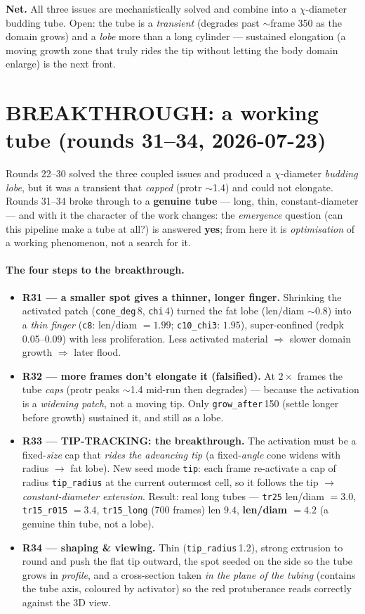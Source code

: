 \documentclass[11pt]{article}
\begin{document}
\textbf{Net.} All three issues are mechanistically solved and combine into a $\chi$-diameter budding tube.
Open: the tube is a \emph{transient} (degrades past $\sim$frame 350 as the domain grows) and a \emph{lobe}
more than a long cylinder --- sustained elongation (a moving growth zone that truly rides the tip without
letting the body domain enlarge) is the next front.

\section{BREAKTHROUGH: a working tube (rounds 31--34, 2026-07-23)}
Rounds 22--30 solved the three coupled issues and produced a $\chi$-diameter \emph{budding lobe}, but it was
a transient that \emph{capped} (protr $\sim$1.4) and could not elongate. Rounds 31--34 broke through to a
\textbf{genuine tube} --- long, thin, constant-diameter --- and with it the character of the work changes:
the \emph{emergence} question (can this pipeline make a tube at all?) is answered \textbf{yes}; from here it is
\emph{optimisation} of a working phenomenon, not a search for it.

\paragraph{The four steps to the breakthrough.}
\begin{itemize}\itemsep2pt
\item \textbf{R31 --- a smaller spot gives a thinner, longer finger.} Shrinking the activated patch
(\texttt{cone\_deg}\,8, \texttt{chi}\,4) turned the fat lobe (len/diam $\sim$0.8) into a \emph{thin finger}
(\texttt{c8}: len/diam $=1.99$; \texttt{c10\_chi3}: $1.95$), super-confined (redpk 0.05--0.09) with less
proliferation. Less activated material $\Rightarrow$ slower domain growth $\Rightarrow$ later flood.
\item \textbf{R32 --- more frames don't elongate it (falsified).} At $2\times$ frames the tube \emph{caps}
(protr peaks $\sim$1.4 mid-run then degrades) --- because the activation is a \emph{widening patch}, not a
moving tip. Only \texttt{grow\_after}\,150 (settle longer before growth) sustained it, and still as a lobe.
\item \textbf{R33 --- TIP-TRACKING: the breakthrough.} The activation must be a fixed-\emph{size} cap that
\emph{rides the advancing tip} (a fixed-\emph{angle} cone widens with radius $\to$ fat lobe). New seed mode
\texttt{tip}: each frame re-activate a cap of radius \texttt{tip\_radius} at the current outermost cell, so
it follows the tip $\to$ \emph{constant-diameter extension}. Result: real long tubes ---
\texttt{tr25} len/diam $=3.0$, \texttt{tr15\_r015} $=3.4$, \texttt{tr15\_long} (700 frames) len $9.4$,
\textbf{len/diam $=4.2$} (a genuine thin tube, not a lobe).
\item \textbf{R34 --- shaping \& viewing.} Thin (\texttt{tip\_radius}\,1.2), strong extrusion to round and push
the flat tip outward, the spot seeded on the side so the tube grows in \emph{profile}, and a cross-section
taken \emph{in the plane of the tubing} (contains the tube axis, coloured by activator) so the red protuberance
reads correctly against the 3D view.
\end{itemize}
\end{document}
